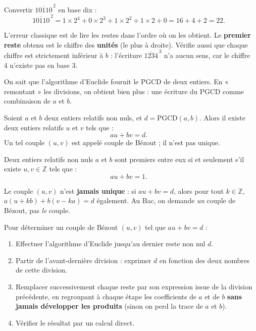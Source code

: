 \documentclass[11pt]{article}
\newcommand{\cle}[1]{{\popxbold\color{popdark}#1}}
\newcounter{popsec}
\newcounter{popsub}
\newcommand{\courssub}[1]{%
  \stepcounter{popsub}%
  \par\vspace{9pt}\noindent{\popxbold\fontsize{11.5}{13}\selectfont\color{popink}{\color{poporange}\thepopsec.\thepopsub}\hspace{6pt}#1}\par\nopagebreak\vspace{4pt}
}
\begin{document}
\begin{exemplebox}
Convertir $\overline{10110}^{\,2}$ en base dix :
\[ \overline{10110}^{\,2} = 1 \times 2^4 + 0 \times 2^3 + 1 \times 2^2 + 1 \times 2 + 0 = 16 + 4 + 2 = 22. \]
\end{exemplebox}

\begin{attention}
L'erreur classique est de lire les restes dans l'ordre où on les obtient. Le \textbf{premier reste} obtenu est le chiffre des \textbf{unités} (le plus à droite). Vérifie aussi que chaque chiffre est strictement inférieur à $b$ : l'écriture $\overline{1234}^{\,3}$ n'a aucun sens, car le chiffre 4 n'existe pas en base 3.
\end{attention}

\courssub{Identité de Bézout}

On sait que l'algorithme d'Euclide fournit le PGCD de deux entiers. En « remontant » les divisions, on obtient bien plus : une écriture du PGCD comme combinaison de $a$ et $b$.

\begin{propriete}
Soient $a$ et $b$ deux entiers relatifs non nuls, et $d = \mathrm{PGCD}(a,b)$. Alors il existe deux entiers relatifs $u$ et $v$ tels que :
\[ au + bv = d. \]
Un tel couple $(u,v)$ est appelé \cle{couple de Bézout} ; il n'est pas unique.
\end{propriete}

\begin{propriete}
Deux entiers relatifs non nuls $a$ et $b$ sont \cle{premiers entre eux} si et seulement s'il existe $u, v \in \mathbb{Z}$ tels que :
\[ au + bv = 1. \]
\end{propriete}

\begin{attention}
Le couple $(u,v)$ n'est \textbf{jamais unique} : si $au + bv = d$, alors pour tout $k \in \mathbb{Z}$, $a(u + kb) + b(v - ka) = d$ également. Au Bac, on demande \emph{un} couple de Bézout, pas \emph{le} couple.
\end{attention}

\begin{methode}
Pour déterminer un couple de Bézout $(u,v)$ tel que $au + bv = d$ :
\begin{enumerate}
\item Effectuer l'algorithme d'Euclide jusqu'au dernier reste non nul $d$.
\item Partir de l'avant-dernière division : exprimer $d$ en fonction des deux nombres de cette division.
\item Remplacer successivement chaque reste par son expression issue de la division précédente, en regroupant à chaque étape les coefficients de $a$ et de $b$ \textbf{sans jamais développer les produits} (sinon on perd la trace de $a$ et $b$).
\item Vérifier le résultat par un calcul direct.
\end{enumerate}
\end{methode}
\end{document}
